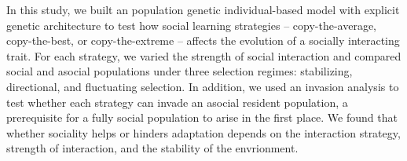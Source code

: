 \documentclass[9pt,twocolumn,twoside]{pnas-new}
\begin{document}
In this study, we built an population genetic individual-based model with explicit genetic architecture to test how social learning strategies -- copy-the-average, copy-the-best, or copy-the-extreme -- affects the evolution of a socially interacting trait. For each strategy, we varied the strength of social interaction and compared social and asocial populations under three selection regimes: stabilizing, directional, and fluctuating selection. In addition, we used an invasion analysis to test whether each strategy can invade an asocial resident population, a prerequisite for a fully social population to arise in the first place. We found that whether sociality helps or hinders adaptation depends on the interaction strategy, strength of interaction, and the stability of the envrionment.






\end{document}
